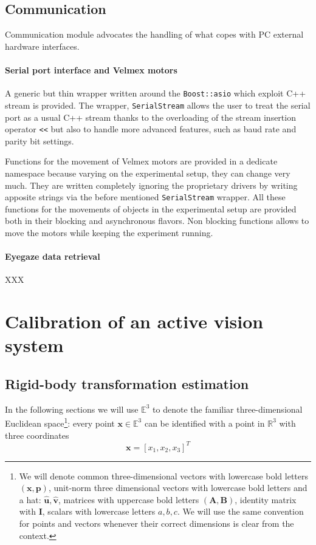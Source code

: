 \documentclass[acmtocl,acmnow]{acmtrans2m}
\begin{document}
\subsection{Communication}
Communication module advocates the handling of what copes with PC external
hardware interfaces.
\paragraph{Serial port interface and Velmex motors}
A generic but thin wrapper written around the \verb=Boost::asio= which exploit C++ stream
is provided.
The wrapper, \verb=SerialStream= allows the user to treat the serial port as a
usual C++ stream thanks to the overloading of the stream insertion operator
\verb=<<= but also to handle more advanced features, such as baud rate and
parity bit settings.

Functions for the movement of Velmex motors are provided in a dedicate namespace because varying on the experimental setup, they can change very much.
They are written completely ignoring the proprietary drivers by writing apposite strings via the before mentioned \verb=SerialStream= wrapper.
All these functions for the movements of objects in the experimental setup are provided both in their blocking and asynchronous flavors.
Non blocking functions allows to move the motors while keeping the experiment running.
\paragraph{Eyegaze data retrieval}
XXX


\section{Calibration of an active vision system}
\subsection{Rigid-body transformation estimation}\label{sec:rigidbodytransformationestimation}
In the following sections we will use $\mathbb{E}^3$ to denote the familiar
three-dimensional Euclidean space\footnote{We will denote common three-dimensional vectors with lowercase bold letters $(\mathbf{x}, \mathbf{p})$, unit-norm three dimensional vectors with lowercase bold letters and a hat: $\mathbf{\hat{u}},\mathbf{\hat{v}}$,  
matrices with uppercase bold letters $(\mathbf{A}, \mathbf{B})$, identity matrix with $\mathbf{I}$, scalars with lowercase letters $a,b,c$. We will use the same convention for points and vectors whenever their correct dimensions is clear from the context.}: every point $\mathbf{x} \in \mathbb{E}^3$ can
be identified with a point in $\mathbb{R}^3$ with three coordinates
$$\mathbf{x} = [x_1, x_2,x_3]^T$$
\end{document}
